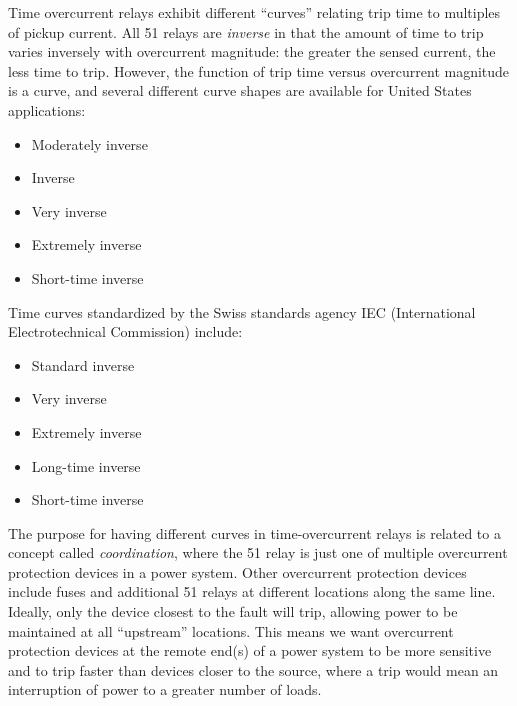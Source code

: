 \vskip 10pt

Time overcurrent relays exhibit different ``curves'' relating trip time to multiples of pickup current.  All 51 relays are \textit{inverse} in that the amount of time to trip varies inversely with overcurrent magnitude: the greater the sensed current, the less time to trip.  However, the function of trip time versus overcurrent magnitude is a curve, and several different curve shapes are available for United States applications:

\begin{itemize}
\item Moderately inverse
\item Inverse
\item Very inverse
\item Extremely inverse
\item Short-time inverse
\end{itemize}

\filbreak

Time curves standardized by the Swiss standards agency IEC (International Electrotechnical Commission) include:

\begin{itemize}
\item Standard inverse
\item Very inverse
\item Extremely inverse
\item Long-time inverse
\item Short-time inverse
\end{itemize}

The purpose for having different curves in time-overcurrent relays is related to a concept called \textit{coordination}, where the 51 relay is just one of multiple overcurrent protection devices in a power system.  Other overcurrent protection devices include fuses and additional 51 relays at different locations along the same line.  Ideally, only the device closest to the fault will trip, allowing power to be maintained at all ``upstream'' locations.  This means we want overcurrent protection devices at the remote end(s) of a power system to be more sensitive and to trip faster than devices closer to the source, where a trip would mean an interruption of power to a greater number of loads.  

